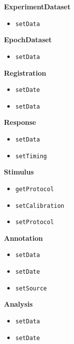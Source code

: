 \documentclass{aodatadocs}
\newcommand{\ret}[1]{\textcolor{purple5}{\texttt{#1}}}
\begin{document}
{\begin{legal}[font=\Large\bfseries, itemsep=1.5ex]
\begin{legal}[font=\large\bfseries, itemsep=1ex]
        \item {\large\textbf{ExperimentDataset}}
            \begin{itemize}
                \item \ret{setData}
            \end{itemize}
        \item {\large\textbf{EpochDataset}}
            \begin{itemize}
                \item \ret{setData}
            \end{itemize}
        \item {\large\textbf{Registration}}
            \begin{itemize}
                \item \ret{setDate}
                \item \ret{setData}
            \end{itemize}
        \item {\large\textbf{Response}}
            \begin{itemize}
                \item \ret{setData}
                \item \ret{setTiming}
            \end{itemize}
        \item {\large\textbf{Stimulus}}
            \begin{itemize}
                \item \ret{getProtocol}
                \item \ret{setCalibration}
                \item \ret{setProtocol}
            \end{itemize}
        \item {\large\textbf{Annotation}}
            \begin{itemize}
                \item \ret{setData}
                \item \ret{setDate}
                \item \ret{setSource}
            \end{itemize}
        \item {\large\textbf{Analysis}}
            \begin{itemize}
                \item \ret{setData}
                \item \ret{setDate}
            \end{itemize}

\end{legal}
\end{legal}}
\end{document}

